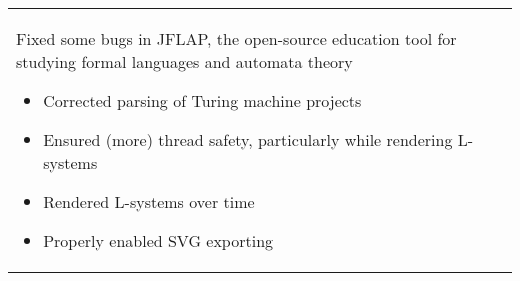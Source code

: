 \documentclass[letterpaper,10pt]{article} %
\begin{document}
\begin{tabular}{ll}
\begin{minipage}[t]{3.5in}
            Fixed some bugs in JFLAP, the open-source education tool
            for studying formal languages and automata theory
            \begin{itemize}
                \item Corrected parsing of Turing machine projects
                \item Ensured (more) thread safety, particularly while rendering L-systems
                \item Rendered L-systems over time
                \item Properly enabled SVG exporting
            \end{itemize}
    \end{minipage}
\end{tabular}
\end{document}

